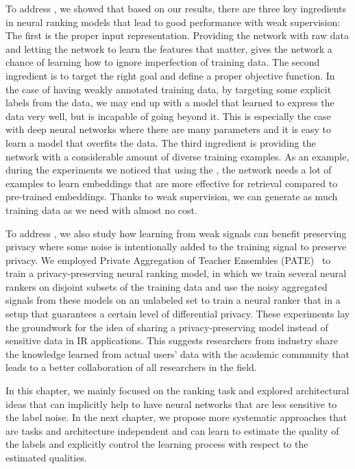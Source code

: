 To address \textbf{}, we showed that based on our results, there are three key ingredients in neural ranking models that lead to good performance with weak supervision:
%
The first is the proper input representation. Providing the network with raw data and letting the network to learn the features that matter, gives the network a chance of learning how to ignore imperfection of training data.
%
The second ingredient is to target the right goal and define a proper objective function. In the case of having weakly annotated training data, by targeting some explicit labels from the data, we may end up with a model that learned to express the data very well, but is incapable of going beyond it. 
This is especially the case with deep neural networks where there are many parameters and it is easy to learn a model that overfits the data.
%
The third ingredient is providing the network with a considerable amount of diverse training examples. 
As an example, during the experiments we noticed that using the \feedthree, the network needs a lot of examples to learn embeddings that are more effective for retrieval compared to pre-trained embeddings. 
Thanks to weak supervision, we can generate as much training data as we need with almost no cost.

To address \textbf{}, we also study how learning from weak signals can benefit preserving privacy where some noise is intentionally added to the training signal to preserve privacy. We employed Private Aggregation of Teacher Ensembles (PATE)~\citep{Papernot:2017}  to train a privacy-preserving neural ranking model, in which we train several neural rankers on disjoint subsets of the training data and use the noisy aggregated signals from these models on an unlabeled set to train a neural ranker that in a setup that guarantees a certain level of differential privacy.
These experiments lay the groundwork for the idea of sharing a privacy-preserving model instead of sensitive data in IR applications. This suggests researchers from industry share the knowledge learned from actual users' data with the academic community that leads to a better collaboration of all researchers in the field. 

\bigskip
In this chapter, we mainly focused on the ranking task and explored architectural ideas that can implicitly help to have neural networks that are less sensitive to the label noise.  
In the next chapter, we propose more systematic approaches that are tasks and architecture independent and can learn to estimate the quality of the labels and explicitly control the learning process with respect to the estimated qualities.